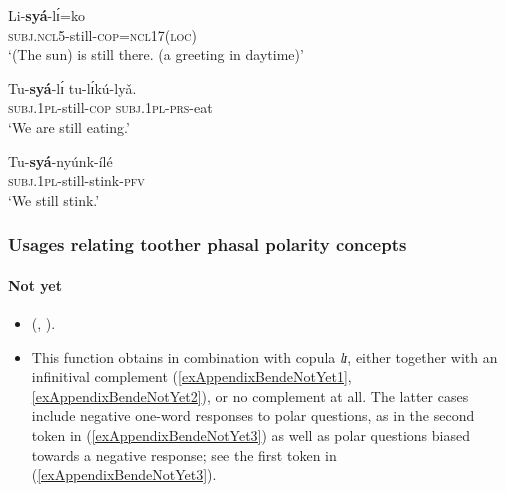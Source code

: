 \begin{exe}
	\ex\label{exAppendixBende1}
	\gll Li-\textbf{syá}-lɪ́=ko\\
	\textsc{subj}.\textsc{ncl}5-still-\textsc{cop}=\textsc{ncl}17(\textsc{loc})\\
	\glt \lq (The sun) is still there. (a greeting in daytime)\rq{ }\parencite[31]{Abe2015}
	
	\ex\label{exAppendixBende2}
	\gll Tu-\textbf{syá}-lɪ́ tu-lɪ́kú-lyǎ.\\
	\textsc{subj}.1\textsc{pl}-still-\textsc{cop} \textsc{subj}.1\textsc{pl}-\textsc{prs}-eat\\
	\glt \lq We are still eating.' \parencite[29]{Abe2015}

	\ex\label{exAppendixBende3}
	\gll Tu-\textbf{syá}-nyúnk-ílé\\
	\textsc{subj}.1\textsc{pl}-still-stink-\textsc{pfv}\\
	\glt \lq We still stink.' \parencite{Abe2016}
\end{exe}

\subsubsection{Usages relating toother phasal polarity concepts}
\paragraph{Not yet}
\label{appendixBendeNotYet}
\begin{itemize}
	\item  \citeauthor{Abe2015} (\citeyear{Abe2015}, \citeyear{Abe2016}).
	\item This function obtains in combination with copula \textit{lɪ}, either together with an infinitival complement (\ref{exAppendixBendeNotYet1}, \ref{exAppendixBendeNotYet2}), or no complement at all. The latter cases include negative one-word responses to polar questions, as in the second token in (\ref{exAppendixBendeNotYet3}) as well as polar questions biased towards a negative response; see the first token in (\ref{exAppendixBendeNotYet3}).
\end{itemize}


